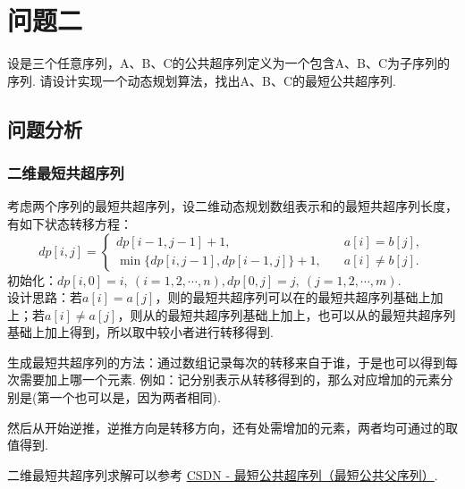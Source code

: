 \documentclass[12pt, a4paper, oneside]{ctexart}
\numberwithin{equation}{section}  %
\begin{document}
\section{问题二}
设是三个任意序列，A、B、C的公共超序列定义为一个包含A、B、C为子序列的序列. 请设计实现一个动态规划算法，找出A、B、C的最短公共超序列.
\subsection{问题分析}
\subsubsection{二维最短共超序列}
考虑两个序列的最短共超序列，设二维动态规划数组表示和的最短共超序列长度，有如下状态转移方程：
\begin{equation*}
    dp[i,j]=\begin{cases}
        dp[i-1,j-1]+1,&\quad a[i] = b[j],\\
        \min\bigg\{dp[i,j-1], dp[i-1,j]\bigg\}+1,&\quad a[i]\neq b[j].
    \end{cases}
\end{equation*}
初始化：$dp[i,0] = i,\ (i=1,2,\cdots, n), dp[0,j] = j,\ (j=1,2,\cdots, m)$.\\
设计思路：若$a[i]=a[j]$，则的最短共超序列可以在的最短共超序列基础上加上；若$a[i]\neq a[j]$，则从的最短共超序列基础上加上，也可以从的最短共超序列基础上加上得到，所以取中较小者进行转移得到.

生成最短共超序列的方法：通过数组记录每次的转移来自于谁，于是也可以得到每次需要加上哪一个元素. 例如：记分别表示从转移得到的，那么对应增加的元素分别是(第一个也可以是，因为两者相同).

然后从开始逆推，逆推方向是转移方向，还有处需增加的元素，两者均可通过的取值得到.

二维最短共超序列求解可以参考 \href{https://blog.csdn.net/qq_43610614/article/details/107826054}{CSDN - 最短公共超序列（最短公共父序列）}.
\end{document}
